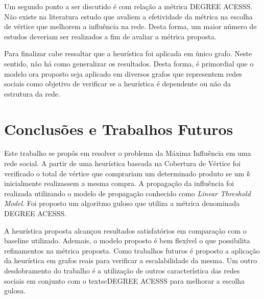 \documentclass[12pt]{article}
\begin{document}
Um segundo ponto a ser discutido é com relação a métrica \textsc{DEGREE ACESSS}{}. Não existe na literatura estudo que avaliem a efetividade da métrica na escolha de vértice que melhorem a influência na rede. Desta forma, um maior número de estudos deveriam ser realizados a fim de avaliar a métrica proposta. 

Para finalizar cabe ressaltar que a heurística foi aplicada em único grafo. Neste sentido, não há como generalizar os resultados. Desta forma, é primordial que o modelo ora proposto seja aplicado em diversos grafos que representem redes sociais como objetivo de verificar se a heurística é dependente ou não da estrutura da rede.

\section{Conclusões e Trabalhos Futuros}

Este trabalho se propôs em resolver o problema da Máxima Influência em uma rede social. A partir de uma heurística baseada na Cobertura de Vértice foi verificado o total de vértice que comprariam um determinado produto se um $k$ inicialmente realizassem a mesma compra. A propagação da influência foi realizada utilizando o modelo de propagação conhecido como \textit{Linear Threshold Model}{}. Foi proposto um algoritmo guloso que utiliza a métrica denominada \textsc{DEGREE ACESSS}{}.

A heurística proposta alcançou resultados satisfatórios em comparação com o baseline utilizado. Ademais, o modelo proposto é bem flexível o que possibilita refinamentos na métrica proposta. Como trabalhos futuros é proposto a aplicação da heurística em grafos reais para verificar a escalabilidade da mesma. Um outro desdobramento do trabalho é a utilização de outros característica das redes sociais em conjunto com o textsc{DEGREE ACESSS}{} para melhorar a escolha gulosa.			



\end{document}
